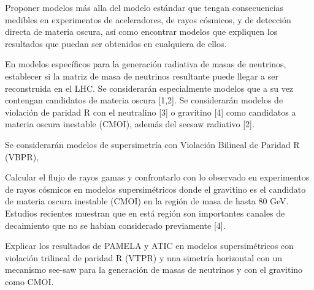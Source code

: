 \begin{ideas}
  
Proponer modelos más alla del modelo estándar que tengan consecuencias medibles en experimentos de aceleradores, de rayos cósmicos, y de detección directa de materia oscura, así como encontrar modelos que expliquen los resultados que puedan ser obtenidos en cualquiera de ellos.

 En modelos específicos para la generación radiativa de masas de neutrinos, establecer si la matriz de masa de neutrinos resultante puede llegar a ser reconstruida en el LHC. Se considerarán especialmente modelos que a su vez contengan candidatos de materia oscura [1,2].  Se considerarán modelos de violación de paridad R con el neutralino [3] o gravitino [4] como candidatos a materia oscura inestable (CMOI), además del seesaw radiativo [2]. 

 Se considerarán modelos de supersimetría con Violación Bilineal de Paridad R (VBPR), 



Calcular el flujo de rayos gamas y confrontarlo con lo observado en experimentos de rayos cósmicos en modelos supersimétricos donde el gravitino es el candidato de materia oscura inestable (CMOI) en la región de masa de hasta 80 GeV. Estudios recientes  muestran que en está región son importantes canales de decaimiento que no se habían considerado previamente [4]. 

Explicar los resultados de PAMELA y ATIC en modelos supersimétricos con violación trilineal de paridad R (VTPR) y una simetría horizontal con un mecanismo see-saw para la generación de masas de neutrinos y con el gravitino como CMOI.




\end{ideas}
